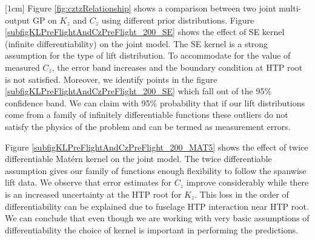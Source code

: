 [1cm]
Figure \ref{fig:cztzRelationship} shows a comparison between two joint multi-output GP on \(K_{z}\) and \(C_{z}\) using different prior distributions. Figure \ref{subfigKLPreFlightAndCzPreFlight_200_SE} shows the effect of SE kernel (infinite differentiability) on the joint model. The SE kernel is a strong assumption for the type of lift distribution. To accommodate for the value of measured \(C_{z}\), the error band increases and the boundary condition at HTP root is not satisfied. Moreover, we identify points in the figure \ref{subfigKLPreFlightAndCzPreFlight_200_SE} which fall out of the 95\% confidence band. We can claim with 95\% probability that if our lift distributions come from a family of infinitely differentiable functions these outliers do not satisfy the physics of the problem and can be termed as measurement errors.

Figure \ref{subfigKLPreFlightAndCzPreFlight_200_MAT5} shows the effect of twice differentiable Mat\'ern kernel on the joint model. The twice differentiable assumption gives our family of functions enough flexibility to follow the spanwise lift data. We observe that error estimates for \(C_{z}\) improve considerably while there is an increased uncertainty at the HTP root for \(K_{z}\). This loss in the order of differentiability can be explained due to fuselage HTP interaction near HTP root. We can conclude that even though we are working with very basic assumptions of differentiability the choice of kernel is important in performing the predictions. 

